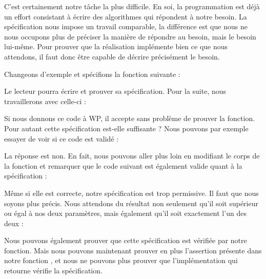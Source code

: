 

C'est certainement notre tâche la plus difficile. En soi, la programmation est
déjà un effort consistant à écrire des algorithmes qui répondent à notre
besoin. La spécification nous impose un travail comparable, la
différence est que nous ne nous occupons plus de préciser la manière de répondre
au besoin, mais le besoin lui-même. Pour prouver que la réalisation implémente
bien ce que nous attendons, il faut donc être capable de décrire précisément le
besoin.



Changeons d'exemple et spécifions la fonction suivante :






Le lecteur pourra écrire et prouver sa spécification. Pour la suite, nous
travaillerons avec celle-ci :






Si nous donnons ce code à WP, il accepte sans problème de prouver la fonction.
Pour autant cette spécification est-elle suffisante ? Nous pouvons par exemple
essayer de voir si ce code est validé :






La réponse est non. En fait, nous pouvons aller plus loin en modifiant le corps
de la fonction  et remarquer que le code suivant est également valide
quant à la spécification :







Même si elle est correcte, notre spécification est trop permissive. Il faut que nous
soyons plus précis.
Nous attendons du résultat non seulement qu'il soit supérieur ou égal à nos
deux paramètres, mais également qu'il soit exactement l'un des deux :





Nous pouvons également prouver que cette spécification est vérifiée par notre
fonction. Mais nous pouvons maintenant prouver en plus l'assertion présente dans
notre fonction , et nous ne pouvons plus prouver que
l'implémentation qui retourne  vérifie la spécification.


